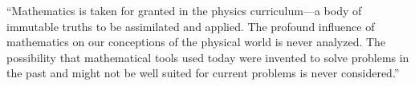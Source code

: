 \documentclass[preview]{standalone}
\begin{document}
\begin{center}
``Mathematics is taken for granted in the physics curriculum—a body of immutable truths to be assimilated and applied. The profound influence of mathematics on our conceptions of the physical world is never analyzed. The possibility that mathematical tools used today were invented to solve problems in the past and might not be well suited for current problems is never considered.''
\end{center}
\end{document}
